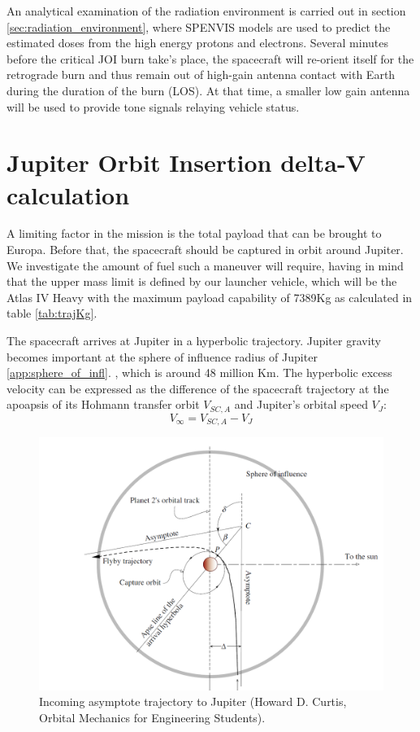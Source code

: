 An analytical examination of the radiation environment is carried out in section \ref{sec:radiation_environment}, where SPENVIS models are used to predict the estimated doses from the high energy protons and electrons. Several minutes before the critical JOI burn take’s place, the spacecraft will re-orient itself for the retrograde burn and thus remain out of high-gain antenna contact with Earth during the duration of the burn (LOS). At that time, a smaller low gain antenna will be used to provide tone signals relaying vehicle status. 
\section{Jupiter Orbit Insertion delta-V calculation}
A limiting factor in the mission is the total payload that can be brought to Europa. Before that, the spacecraft should be captured in orbit around Jupiter. We investigate the amount of fuel such a maneuver will require, having in mind that the upper mass limit is defined by our launcher vehicle, which will be the Atlas IV Heavy with the maximum payload capability of 7389Kg as calculated in table \ref{tab:trajKg}.

The spacecraft arrives at Jupiter in a hyperbolic trajectory. Jupiter gravity becomes important at the sphere of influence radius of Jupiter \ref{app:sphere_of_infl}.
, which is around 48 million Km. The hyperbolic excess velocity can be expressed as the difference of the spacecraft trajectory at the apoapsis of its Hohmann transfer orbit $V_{SC,A}$ and Jupiter’s orbital speed $V_J$:
\begin{equation}
V_\infty=V_{SC,A}-V_J
\end{equation}

\begin{figure}[htb!]
\centering
\includegraphics[scale=0.3]{figures/Orbiter/capture.png}
\caption{Incoming asymptote trajectory to Jupiter (Howard D. Curtis, Orbital Mechanics for Engineering Students).\cite{orbitals}}
\label{fig:capture}
\end{figure}

